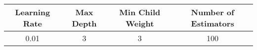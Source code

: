 \footnotesize
\begin{tabular}{cccc}
\toprule
Learning Rate & Max Depth & Min Child Weight & Number of Estimators \\
\midrule
0.01 & 3 & 3 & 100 \\
\bottomrule
\end{tabular}

\normalsize